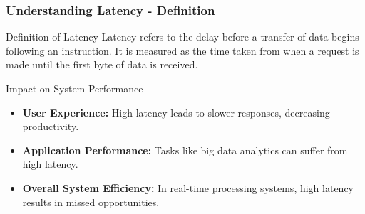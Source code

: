 \documentclass[aspectratio=169]{beamer}
\begin{document}
\begin{frame}[fragile]
    \frametitle{Understanding Latency - Definition}
    \begin{block}{Definition of Latency}
        Latency refers to the delay before a transfer of data begins following an instruction. It is measured as the time taken from when a request is made until the first byte of data is received. 
    \end{block}
    
    \begin{block}{Impact on System Performance}
        \begin{itemize}
            \item \textbf{User Experience:} High latency leads to slower responses, decreasing productivity.
            \item \textbf{Application Performance:} Tasks like big data analytics can suffer from high latency.
            \item \textbf{Overall System Efficiency:} In real-time processing systems, high latency results in missed opportunities.
        \end{itemize}
    \end{block}
\end{frame}
\end{document}
